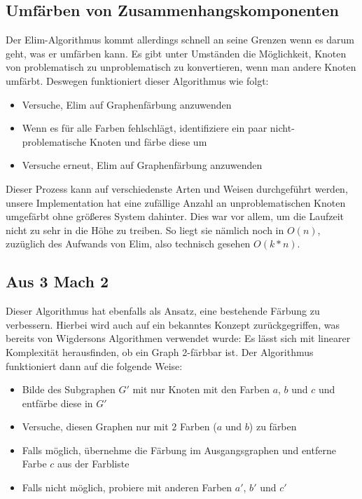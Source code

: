 \documentclass[11pt]{article}
\begin{document}
\subsection{Umfärben von Zusammenhangskomponenten}

Der Elim-Algorithmus kommt allerdings schnell an seine Grenzen wenn es darum geht, was er umfärben kann. Es gibt unter Umständen die Möglichkeit,
Knoten von problematisch zu unproblematisch zu konvertieren, wenn man andere Knoten umfärbt. Deswegen funktioniert dieser Algorithmus wie folgt: \\

\begin{itemize}
  \item Versuche, Elim auf Graphenfärbung anzuwenden
  \item Wenn es für alle Farben fehlschlägt, identifiziere ein paar nicht-problematische Knoten und färbe diese um
  \item Versuche erneut, Elim auf Graphenfärbung anzuwenden
\end{itemize}

Dieser Prozess kann auf verschiedenste Arten und Weisen durchgeführt werden, unsere Implementation hat eine zufällige Anzahl an unproblematischen Knoten umgefärbt ohne größeres System dahinter.
Dies war vor allem, um die Laufzeit nicht zu sehr in die Höhe zu treiben. So liegt sie nämlich noch in $O(n)$, zuzüglich des Aufwands von Elim, also technisch gesehen $O(k*n)$.

\subsection{Aus 3 Mach 2}

Dieser Algorithmus hat ebenfalls als Ansatz, eine bestehende Färbung zu verbessern. Hierbei wird auch auf ein bekanntes Konzept
zurückgegriffen, was bereits von Wigdersons Algorithmen verwendet wurde: Es lässt sich mit linearer Komplexität herausfinden,
ob ein Graph 2-färbbar ist. Der Algorithmus funktioniert dann auf die folgende Weise: \\

\begin{itemize}
  \item Bilde des Subgraphen $G'$ mit nur Knoten mit den Farben $a$, $b$ und $c$ und entfärbe diese in $G'$
  \item Versuche, diesen Graphen nur mit $2$ Farben ($a$ und $b$) zu färben
  \item Falls möglich, übernehme die Färbung im Ausgangsgraphen und entferne Farbe $c$ aus der Farbliste
  \item Falls nicht möglich, probiere mit anderen Farben $a'$, $b'$ und $c'$
\end{itemize}
\end{document}
